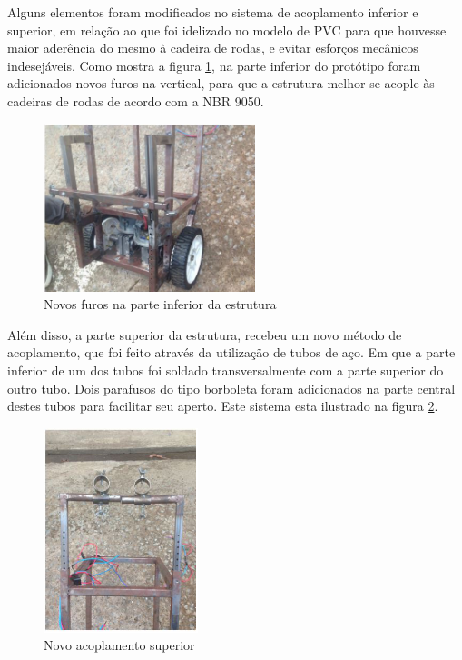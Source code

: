 Alguns elementos foram modificados no sistema de acoplamento inferior e superior, em relação ao que foi idelizado no modelo de PVC para que houvesse maior aderência do mesmo à cadeira de rodas, e evitar esforços mecânicos indesejáveis. Como mostra a figura \ref{fig:furos_estrutura}, na parte inferior do protótipo foram adicionados novos furos na vertical, para que a estrutura melhor se acople às cadeiras de rodas de acordo com a NBR 9050.

\begin{figure}[!htb]
\centering
\includegraphics[width=0.55\textwidth]{figuras/resultados/furos_estrutura}
\caption{Novos furos na parte inferior da estrutura}
\label{fig:furos_estrutura}
\end{figure}

Além disso, a parte superior da estrutura, recebeu um novo método de acoplamento, que foi feito através da utilização de tubos de aço. Em que a parte inferior de um dos tubos foi soldado transversalmente com a parte superior do outro tubo. Dois parafusos do tipo borboleta foram adicionados na parte central destes tubos para facilitar seu aperto. Este sistema esta ilustrado na figura \ref{fig:novo_acoplamento_superior}.

\begin{figure}[!ht]
\centering
\includegraphics[width=0.4\textwidth]{figuras/resultados/novo_acoplamento_superior}
\caption{Novo acoplamento superior}
\label{fig:novo_acoplamento_superior}
\end{figure}


